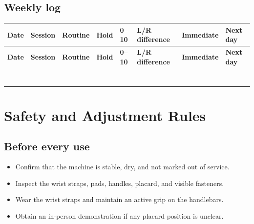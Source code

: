 \documentclass[10pt,letterpaper]{article}
\begin{document}
\subsection{Weekly log}

\small
\begin{longtable}{@{}L{0.52in}L{0.72in}L{0.82in}L{0.57in}L{0.52in}L{0.82in}L{0.8in}L{0.8in}@{}}
\toprule
{}
\color{white}\textbf{Date} & \color{white}\textbf{Session} & \color{white}\textbf{Routine} & \color{white}\textbf{Hold} & \color{white}\textbf{0--10} & \color{white}\textbf{L/R difference} & \color{white}\textbf{Immediate} & \color{white}\textbf{Next day} \\
\midrule
\endfirsthead
\toprule
{}
\color{white}\textbf{Date} & \color{white}\textbf{Session} & \color{white}\textbf{Routine} & \color{white}\textbf{Hold} & \color{white}\textbf{0--10} & \color{white}\textbf{L/R difference} & \color{white}\textbf{Immediate} & \color{white}\textbf{Next day} \\
\midrule
\endhead
\rule{0pt}{7mm} & & & & & & & \\
\midrule
\rule{0pt}{7mm} & & & & & & & \\
\midrule
\rule{0pt}{7mm} & & & & & & & \\
\midrule
\rule{0pt}{7mm} & & & & & & & \\
\midrule
\rule{0pt}{7mm} & & & & & & & \\
\midrule
\rule{0pt}{7mm} & & & & & & & \\
\midrule
\rule{0pt}{7mm} & & & & & & & \\
\bottomrule
\end{longtable}
\normalsize

\section{Safety and Adjustment Rules}

\subsection{Before every use}

\begin{itemize}
  \item Confirm that the machine is stable, dry, and not marked out of service.
  \item Inspect the wrist straps, pads, handles, placard, and visible fasteners.
  \item Wear the wrist straps and maintain an active grip on the handlebars.
  \item Obtain an in-person demonstration if any placard position is unclear.
\end{itemize}
\end{document}
